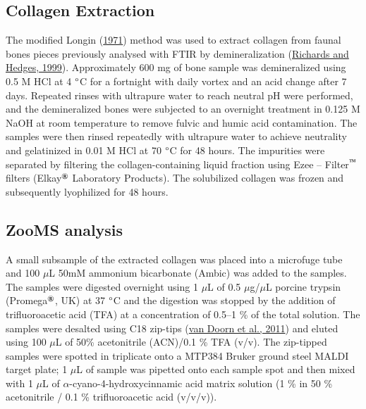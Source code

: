 \documentclass[3p]{elsarticle} %
\begin{document}
\hypertarget{collagen-extraction}{%
\subsection{Collagen Extraction}\label{collagen-extraction}}

The modified Longin (\protect\hyperlink{ref-longin71}{1971}) method was used to extract collagen from faunal bones pieces previously analysed with FTIR by demineralization (\protect\hyperlink{ref-richards_hedges99}{Richards and Hedges, 1999}). Approximately 600 mg of bone sample was demineralized using 0.5 M HCl at 4 \(\text{\textdegree}\)C for a fortnight with daily vortex and an acid change after 7 days. Repeated rinses with ultrapure water to reach neutral pH were performed, and the demineralized bones were subjected to an overnight treatment in 0.125 M NaOH at room temperature to remove fulvic and humic acid contamination. The samples were then rinsed repeatedly with ultrapure water to achieve neutrality and gelatinized in 0.01 M HCl at 70 \(\text{\textdegree}\)C for 48 hours. The impurities were separated by filtering the collagen-containing liquid fraction using Ezee -- Filter\(^\text{\texttrademark}\) filters (Elkay\(^\text{\textregistered}\) Laboratory Products). The solubilized collagen was frozen and subsequently lyophilized for 48 hours.

\hypertarget{zooms-analysis}{%
\subsection{ZooMS analysis}\label{zooms-analysis}}

A small subsample of the extracted collagen was placed into a microfuge tube and 100 \(\mu\)L 50mM ammonium bicarbonate (Ambic) was added to the samples. The samples were digested overnight using 1 \(\mu\)L of 0.5 \(\mu\)g/\(\mu\)L porcine trypsin (Promega\(^\text{\textregistered}\), UK) at 37 \(\text{\textdegree}\)C and the digestion was stopped by the addition of trifluoroacetic acid (TFA) at a concentration of 0.5--1 \% of the total solution. The samples were desalted using C18 zip-tips (\protect\hyperlink{ref-vandoorn_etal11}{van Doorn et al., 2011}) and eluted using 100 \(\mu\)L of 50\% acetonitrile (ACN)/0.1 \% TFA (v/v). The zip-tipped samples were spotted in triplicate onto a MTP384 Bruker ground steel MALDI target plate; 1 \(\mu\)L of sample was pipetted onto each sample spot and then mixed with 1 \(\mu\)L of \(\alpha\)-cyano-4-hydroxycinnamic acid matrix solution (1 \% in 50 \% acetonitrile / 0.1 \% trifluoroacetic acid (v/v/v)).
\end{document}
